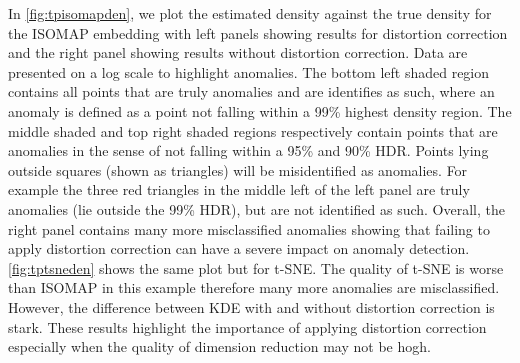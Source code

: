 \documentclass[11pt,a4paper,]{article}
\begin{document}
In \autoref{fig:tpisomapden}, we plot the estimated density against the true density for the ISOMAP embedding with left panels showing results for distortion correction and the right panel showing results without distortion correction. Data are presented on a log scale to highlight anomalies. The bottom left shaded region contains all points that are truly anomalies and are identifies as such, where an anomaly is defined as a point not falling within a 99\% highest density region. The middle shaded and top right shaded regions respectively contain points that are anomalies in the sense of not falling within a 95\% and 90\% HDR. Points lying outside squares (shown as triangles) will be misidentified as anomalies. For example the three red triangles in the middle left of the left panel are truly anomalies (lie outside the 99\% HDR), but are not identified as such. Overall, the right panel contains many more misclassified anomalies showing that failing to apply distortion correction can have a severe impact on anomaly detection. \autoref{fig:tptsneden} shows the same plot but for t-SNE. The quality of t-SNE is worse than ISOMAP in this example therefore many more anomalies are misclassified. However, the difference between KDE with and without distortion correction is stark. These results highlight the importance of applying distortion correction especially when the quality of dimension reduction may not be hogh.
\end{document}
